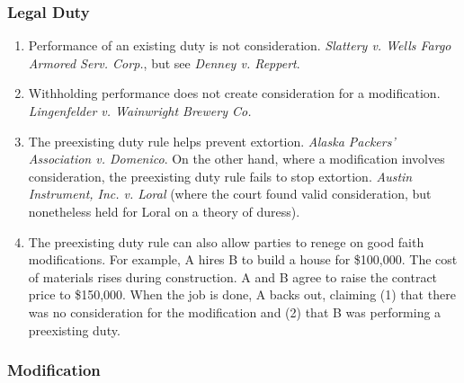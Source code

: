 \subsubsection{Legal Duty}

\begin{enumerate}
    \item Performance of an existing duty is not consideration. \emph{Slattery 
    v. Wells Fargo Armored Serv. Corp.}, but see \emph{Denney v. Reppert}.
    \item Withholding performance does not create consideration for a 
    modification. \emph{Lingenfelder v. Wainwright Brewery Co.}
    \item The preexisting duty rule helps prevent extortion. \emph{Alaska 
    Packers' Association v. Domenico}. On the other hand, where a modification 
    involves consideration, the preexisting duty rule fails to stop extortion. 
    \emph{Austin Instrument, Inc. v. Loral} (where the court found valid 
    consideration, but nonetheless held for Loral on a theory of duress).
    \item The preexisting duty rule can also allow parties to renege on good 
    faith modifications. For example, A hires B to build a house for 
    \$100,000. The cost of materials rises during construction. A and B agree 
    to raise the contract price to \$150,000. When the job is done, A backs 
    out, claiming (1) that there was no consideration for the modification and 
    (2) that B was performing a preexisting duty.
\end{enumerate}

\subsubsection{Modification}

